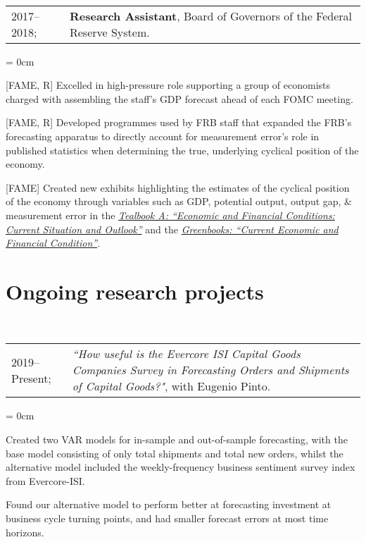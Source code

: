 \documentclass[a4paper, 11pt]{article}
\begin{document}
  ~\begin{tabular}{ll}
    2017--2018; & \textbf{Research Assistant}, Board of Governors of the Federal Reserve System.
  \end{tabular}
  \begin{compactitem}\parskip = 0cm
    \item {[FAME, R]} Excelled in high-pressure role supporting a group of economists charged with assembling the staff's GDP forecast ahead of each FOMC meeting.
    \item {[FAME, R]} Developed programmes used by FRB staff that expanded the FRB's forecasting apparatus to directly account for measurement error's role in published statistics when determining the true, underlying cyclical position of the economy.
    \item {[FAME]} Created new exhibits highlighting the estimates of the cyclical position of the economy through variables such as GDP, potential output, output gap, \& measurement error in the \href{https://www.federalreserve.gov/monetarypolicy/fomc_historical.htm#tealbooks}{\textit{Tealbook A: ``Economic and Financial Conditions: Current Situation and Outlook''}} and the \href{https://www.federalreserve.gov/monetarypolicy/fomc_historical.htm#greenbooks}{\textit{Greenbooks: ``Current Economic and Financial Condition''}}.
  \end{compactitem}
      
  \section{Ongoing research projects}
  ~\begin{tabular}{l p{13cm}}
    2019--Present; & \textit{``How useful is the Evercore ISI Capital Goods Companies Survey in Forecasting Orders and Shipments of Capital Goods?"}, with Eugenio Pinto.
  \end{tabular}
  \begin{compactitem}\parskip = 0cm
    \item Created two VAR models for in-sample and out-of-sample forecasting, with the base model consisting of only total shipments and total new orders, whilst the alternative model included the weekly-frequency business sentiment survey index from Evercore-ISI.
    \item Found our alternative model to perform better at forecasting investment at business cycle turning points, and had smaller forecast errors at most time horizons.
  \end{compactitem}
  \vspace*{1em}
      
\end{document}
